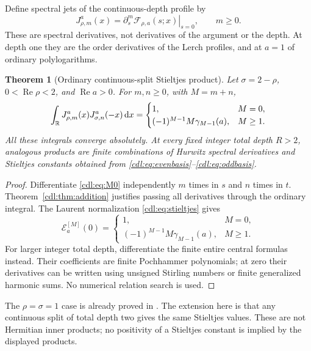 \documentclass[11pt,letterpaper]{article}
\numberwithin{equation}{section}
\newtheorem{theorem}{Theorem}[section]
\theoremstyle{definition}\newtheorem{definition}[theorem]{Definition}
\theoremstyle{remark}\newtheorem{remark}[theorem]{Remark}
\newcommand{\Rea}{\operatorname{Re}}\newcommand{\Ima}{\operatorname{Im}}
\newcommand{\F}{\mathcal F}\newcommand{\E}{\mathcal E}
\begin{document}
Define spectral jets of the continuous-depth profile by
\begin{equation}\label{cdl:eq:Jdef}
 J_{\rho,m}^a(x)=
 \left.\partial_s^m\F_{\rho,a}(s;x)\right|_{s=0},\qquad m\ge0.
\end{equation}
These are spectral derivatives, not derivatives of the argument or the
depth. At depth one they are the order derivatives of the Lerch profiles,
and at $a=1$ of ordinary polylogarithms.

\begin{theorem}[Ordinary continuous-split Stieltjes product]
\label{cdl:thm:stieltjes}
Let $\sigma=2-\rho$, $0<\Rea\rho<2$, and $\Rea a>0$.
For $m,n\ge0$, with $M=m+n$,
\begin{equation}\label{cdl:eq:Jpair}
 \int_\mathbb R J_{\rho,m}^a(x)J_{\sigma,n}^a(-x)\,\mathrm d x
 =\begin{cases}
 1,&M=0,\\
 (-1)^{M-1}M\gamma_{M-1}(a),&M\ge1.
 \end{cases}
\end{equation}
All these integrals converge absolutely. At every fixed integer total
depth $R>2$, analogous products are finite combinations of Hurwitz
spectral derivatives and Stieltjes constants obtained from
\eqref{cdl:eq:evenbasis}--\eqref{cdl:eq:oddbasis}.
\end{theorem}
\begin{proof}
Differentiate \eqref{cdl:eq:M0} independently $m$ times in $s$ and $n$
times in $t$. Theorem~\ref{cdl:thm:addition} justifies passing all
derivatives through the ordinary integral. The Laurent normalization
\eqref{cdl:eq:stieltjes} gives
\begin{equation}\label{cdl:eq:Ejets}
 \E_a^{[M]}(0)=
 \begin{cases}1,&M=0,\\(-1)^{M-1}M\gamma_{M-1}(a),&M\ge1.
 \end{cases}
\end{equation}
For larger integer total depth, differentiate the finite entire central
formulas instead. Their coefficients are finite Pochhammer polynomials;
at zero their derivatives can be written using unsigned Stirling numbers
or finite generalized harmonic sums. No numerical relation search is used.
\end{proof}

The $\rho=\sigma=1$ case is already proved in \cite{RLC}. The extension
here is that any continuous split of total depth two gives the same
Stieltjes values. These are not Hermitian inner products; no positivity
of a Stieltjes constant is implied by the displayed products.
\end{document}
